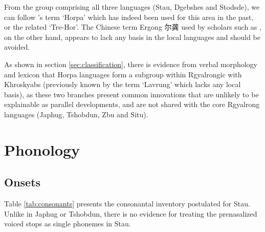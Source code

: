 \documentclass[oneside,a4paper,11pt]{article}
\newcommand{\zh}[1]{{\cn #1}}
\begin{document}
From the group comprising all three languages (Stau, Dgebshes and Stodsde),  we can follow 
\citet{jackson00sidaba}'s term `Horpa' which has indeed been used for this area in the past, or the related `Tre-Hor'.  The Chinese term Ergong \zh{尔龚} used by scholars such as \citet{sun83liujiang}, on the other hand, appears to lack any basis in the local languages and should be avoided.
 
As shown in section \ref{sec:classification}, there is evidence from verbal morphology and lexicon that Horpa languages form a subgroup within Rgyalrongic with Khroskyabs (previously known by the term `Lavrung' which lacks any local basis), as these two branches present common innovations that are unlikely to be explainable as parallel developments, and are not shared with the core Rgyalrong languages (Japhug, Tshobdun, Zbu and Situ).
 
\section{Phonology}
 
 
  \subsection{Onsets}
  Table \ref{tab:consonants} presents the consonantal inventory postulated for Stau. Unlike in Japhug or Tshobdun, there is no evidence for treating the prenasalized voiced stops as single phonemes in Stau.
  
\end{document}

